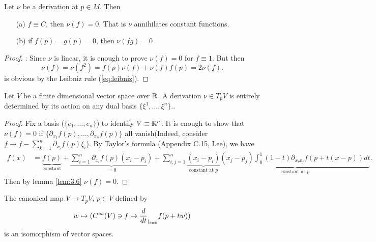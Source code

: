 \begin{lemma}\label{lem:3.6}
    Let \(\nu\) be a derivation at \(p\in M\). Then 
    \begin{enumerate}
        \item[(a)] \(f\equiv C\), then \(\nu(f)=0\). That is \(\nu\) annihilates constant functions.
        \item[(b)] if \(f(p)=g(p)=0\), then \(\nu(fg)=0\) 
    \end{enumerate}
\end{lemma}

\begin{proof}
    : Since \(\nu\) is linear, it is enough to prove \(\nu(f)=0\) for \(f\equiv 1\). But then 
    \[\nu(f)=\nu(f^2)=f(p)\nu(f)+\nu(f)f(p)=2\nu(f).\]
     is obvious by the Leibniz rule (\ref{eq:leibniz}).
\end{proof}

\begin{lemma}\label{lem:3.7} %
    Let \(V\) be a finite dimensional vector space over \(\mathbb{R}\). A derivation \(\nu\in T_pV\) is entirely determined by its action 
    on any dual basis \(\{\xi^1,\dots,\xi^n\}\)..     
\end{lemma}

\begin{proof}
    Fix a basis (\(\{e_1,\dots,e_n\}\)) to identify \(V\equiv \mathbb{R}^n\). It is enough to show  
    that \(\nu(f)=0\) if \(\{\partial_{x_1} f(p),\dots,\partial_{x_n} f(p)\}\) all vanish(Indeed, consider \(f\to f-\sum_{k=1}^n \partial_{x_i}f(p)\xi_i\)).
    By Taylor's formula (Appendix C.15, Lee), we have
    \begin{align*}
        f(x) &= \underbrace{f(p)}_{\text{constant}}+\underbrace{\sum_{i=1}^n\partial_{x_i} f(p)(x_i-p_i)}_{=0}+\sum_{i,j=1}^n \underbrace{(x_i-p_i)}_{\text{constant at }p}\underbrace{(x_j-p_j)\int_0^1 (1-t)\partial_{x_ix_j} f(p+t(x-p)) dt}_{\text{constant at }p}.
    \end{align*}
    Then by lemma \ref{lem:3.6} \(\nu(f)=0\).
\end{proof}

\begin{corollary}\label{cor:3.8} 
    The canonical map \(V\to T_pV\), \(p\in V\)
    defined by 
    \[w\mapsto (C^\infty(V)\ni f\mapsto \frac{d}{dt}_{|_{t=0}}f(p+tw))\]
    is an isomorphism of vector spaces.
\end{corollary}

